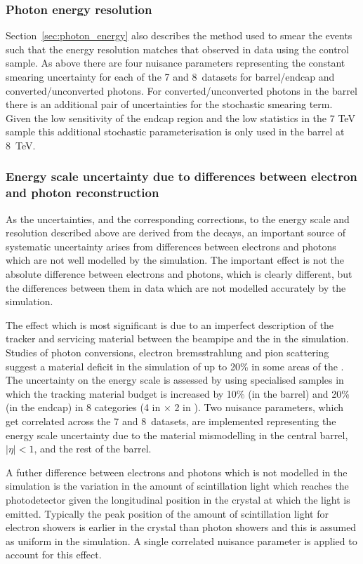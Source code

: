 \subsubsection{Photon energy resolution}
Section~\ref{sec:photon_energy} also describes the method used to smear the \MC events such that the energy resolution matches that observed in data using the \Zee control sample. As above there are four nuisance parameters representing the constant smearing uncertainty for each of the 7 and 8~\TeV datasets for barrel/endcap and converted/unconverted photons. For converted/unconverted photons in the barrel there is an additional pair of uncertainties for the stochastic smearing term. Given the low sensitivity of the endcap region and the low statistics in the 7 TeV sample this additional stochastic parameterisation is only used in the barrel at 8~TeV.

\subsubsection{Energy scale uncertainty due to differences between electron and photon reconstruction}
As the uncertainties, and the corresponding corrections, to the energy scale and resolution described above are derived from the \Zee decays, an important source of systematic uncertainty arises from differences between electrons and photons which are not well modelled by the \MC simulation. The important effect is not the absolute difference between electrons and photons, which is clearly different, but the differences between them in data which are not modelled accurately by the simulation. 

The effect which is most significant is due to an imperfect description of the tracker and servicing material between the beampipe and the \ECAL in the simulation. Studies of photon conversions, electron bremsstrahlung and pion scattering suggest a material deficit in the simulation of up to 20\% in some areas of the \ECAL. The uncertainty on the energy scale is assessed by using specialised \MC samples in which the tracking material budget is increased by 10\% (in the barrel) and 20\% (in the endcap) in 8 categories (4 in \eta $\times$ 2 in \rnine). Two nuisance parameters, which get correlated across the 7 and 8~\TeV datasets, are implemented representing the energy scale uncertainty due to the material mismodelling in the central barrel, $|\eta|<1$, and the rest of the barrel.

A futher difference between electrons and photons which is not modelled in the simulation is the variation in the amount of scintillation light which reaches the photodetector given the longitudinal position in the crystal at which the light is emitted. Typically the peak position of the amount of scintillation light for electron showers is earlier in the crystal than photon showers and this is assumed as uniform in the simulation. A single correlated nuisance parameter is applied to account for this effect.

